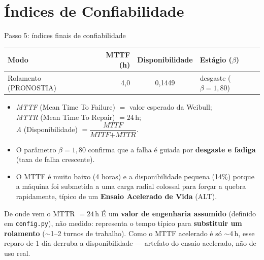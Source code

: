 \documentclass{beamer}
\begin{document}
\section{Índices de Confiabilidade}

\begin{frame}{Passo 5: índices finais de confiabilidade}
    \footnotesize
    \begin{tabular}{lrcl}
        \toprule
        \textbf{Modo} & \textbf{MTTF (h)} & \textbf{Disponibilidade} & \textbf{Estágio ($\beta$)} \\
        \midrule
        Rolamento (PRONOSTIA) & 4,0 & 0,1449 & desgaste ($\beta{=}1{,}80$) \\
        \bottomrule
    \end{tabular}
    \scriptsize
    \vspace{0.2cm}
    \begin{itemize}
        \item \textit{MTTF} (Mean Time To Failure) $=$ valor esperado da Weibull;\\ \textit{MTTR} (Mean Time To Repair) $=24$\,h;\\ \textit{A} (Disponibilidade) $= \dfrac{\textit{MTTF}}{\textit{MTTF}+\textit{MTTR}}$.
        \item O parâmetro $\beta=1{,}80$ confirma que a falha é guiada por \textbf{desgaste e fadiga} (taxa de falha crescente).
        \item O MTTF é muito baixo (4 horas) e a disponibilidade pequena (14\%) porque a máquina foi submetida a uma carga radial colossal para forçar a quebra rapidamente, típico de um \textbf{Ensaio Acelerado de Vida} (ALT).
    \end{itemize}
    \vspace{0.05cm}
    \begin{block}{De onde vem o MTTR $=24$\,h}
        \tiny É um \textbf{valor de engenharia assumido} (definido em \texttt{config.py}), não medido: representa o tempo típico para \textbf{substituir um rolamento} ($\sim$1--2 turnos de trabalho). Como o MTTF acelerado é só $\sim$4\,h, esse reparo de 1 dia derruba a disponibilidade --- artefato do ensaio acelerado, não de uso real.
    \end{block}
\end{frame}
\end{document}
